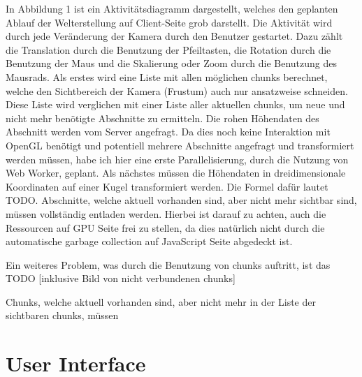 In Abbildung 1 ist ein Aktivitätsdiagramm dargestellt, welches den geplanten Ablauf der Welterstellung auf Client-Seite grob darstellt. Die Aktivität wird durch jede Veränderung der Kamera durch den Benutzer gestartet. Dazu zählt die Translation durch die Benutzung der Pfeiltasten, die Rotation durch die Benutzung der Maus und die Skalierung oder Zoom durch die Benutzung des Mausrads. Als erstes wird eine Liste mit allen möglichen chunks berechnet, welche den Sichtbereich der Kamera (Frustum) auch nur ansatzweise schneiden. Diese Liste wird verglichen mit einer Liste aller aktuellen chunks, um neue und nicht mehr benötigte Abschnitte zu ermitteln. Die rohen Höhendaten des Abschnitt werden vom Server angefragt. Da dies noch keine Interaktion mit OpenGL benötigt und potentiell mehrere Abschnitte angefragt und transformiert werden müssen, habe ich hier eine erste Parallelisierung, durch die Nutzung von Web Worker, geplant. Als nächstes müssen die Höhendaten in dreidimensionale Koordinaten auf einer Kugel transformiert werden. Die Formel dafür lautet TODO. Abschnitte, welche aktuell vorhanden sind, aber nicht mehr sichtbar sind, müssen vollständig entladen werden. Hierbei ist darauf zu achten, auch die Ressourcen auf GPU Seite frei zu stellen, da dies natürlich nicht durch die automatische garbage collection auf JavaScript Seite abgedeckt ist. 

Ein weiteres Problem, was durch die Benutzung von chunks auftritt, ist das TODO [inklusive Bild von nicht verbundenen chunks]


Chunks, welche aktuell vorhanden sind, aber nicht mehr in der Liste der sichtbaren chunks, müssen 


\section{User Interface}

